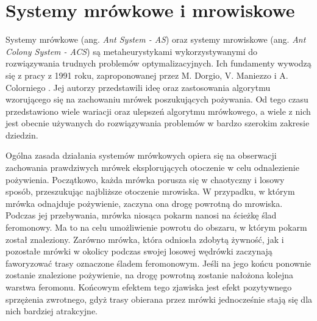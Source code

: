\chapter{Systemy mrówkowe i mrowiskowe}\label{chap:antsys}
{

    Systemy mrówkowe (ang. \textit{Ant System - AS}) oraz systemy mrowiskowe (ang. \textit{Ant Colony System - ACS}) są
    metaheurystykami wykorzystywanymi do rozwiązywania trudnych problemów optymalizacyjnych. Ich fundamenty wywodzą się
    z pracy z 1991 roku, zaproponowanej przez M. Dorgio, V. Maniezzo i A. Colorniego \cite{Dorigo1991AntSA}. Jej autorzy
    przedstawili ideę oraz zastosowania algorytmu wzorującego się na zachowaniu mrówek poszukujących pożywania. Od tego
    czasu przedstawiono wiele wariacji oraz ulepszeń algorytmu mrówkowego, a wiele z nich jest obecnie używanych do
    rozwiązywania problemów w bardzo szerokim zakresie dziedzin.

    Ogólna zasada działania systemów mrówkowych opiera się na obserwacji zachowania prawdziwych mrówek eksplorujących
    otoczenie w celu odnalezienie pożywienia. Początkowo, każda mrówka porusza się w chaotyczny i losowy sposób,
    przeszukując najbliższe otoczenie mrowiska. W przypadku, w którym mrówka odnajduje pożywienie, zaczyna ona drogę
    powrotną do mrowiska. Podczas jej przebywania, mrówka niosąca pokarm nanosi na ścieżkę ślad feromonowy. Ma to na
    celu umożliwienie powrotu do obszaru, w którym pokarm został znaleziony. Zarówno mrówka, która odniosła zdobytą
    żywność, jak i pozostałe mrówki w okolicy podczas swojej losowej wędrówki zaczynają faworyzować trasy oznaczone
    śladem feromonowym. Jeśli na jego końcu ponownie zostanie znalezione pożywienie, na drogę powrotną zostanie nałożona
    kolejna warstwa feromonu. Końcowym efektem tego zjawiska jest efekt pozytywnego sprzężenia zwrotnego, gdyż trasy
    obierana przez mrówki jednocześnie stają się dla nich bardziej atrakcyjne.

}
